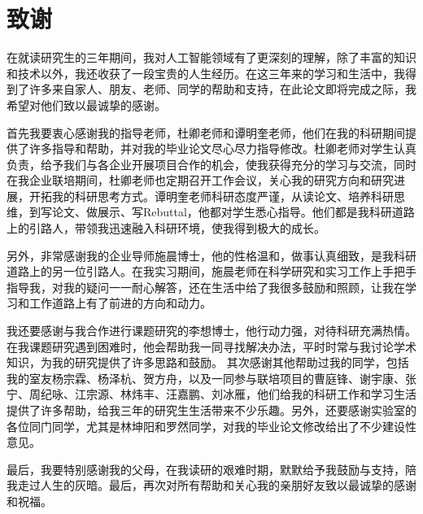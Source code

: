 \chapter{致\texorpdfstring{\quad}{}谢}

在就读研究生的三年期间，我对人工智能领域有了更深刻的理解，除了丰富的知识和技术以外，我还收获了一段宝贵的人生经历。在这三年来的学习和生活中，我得到了许多来自家人、朋友、老师、同学的帮助和支持，在此论文即将完成之际，我希望对他们致以最诚挚的感谢。

首先我要衷心感谢我的指导老师，杜卿老师和谭明奎老师，他们在我的科研期间提供了许多指导和帮助，并对我的毕业论文尽心尽力指导修改。杜卿老师对学生认真负责，给予我们与各企业开展项目合作的机会，使我获得充分的学习与交流，同时在我企业联培期间，杜卿老师也定期召开工作会议，关心我的研究方向和研究进展，开拓我的科研思考方式。谭明奎老师科研态度严谨，从读论文、培养科研思维，到写论文、做展示、写Rebuttal，他都对学生悉心指导。他们都是我科研道路上的引路人，带领我迅速融入科研环境，使我得到极大的成长。

另外，非常感谢我的企业导师施晨博士，他的性格温和，做事认真细致，是我科研道路上的另一位引路人。在我实习期间，施晨老师在科学研究和实习工作上手把手指导我，对我的疑问一一耐心解答，还在生活中给了我很多鼓励和照顾，让我在学习和工作道路上有了前进的方向和动力。

我还要感谢与我合作进行课题研究的李想博士，他行动力强，对待科研充满热情。在我课题研究遇到困难时，他会帮助我一同寻找解决办法，平时时常与我讨论学术知识，为我的研究提供了许多思路和鼓励。
其次感谢其他帮助过我的同学，包括我的室友杨宗霖、杨泽杭、贺方舟，以及一同参与联培项目的曹庭锋、谢宇康、张宁、周纪咏、江宗源、林炜丰、汪嘉鹏、刘冰雁，他们给我的科研工作和学习生活提供了许多帮助，给我三年的研究生生活带来不少乐趣。另外，还要感谢实验室的各位同门同学，尤其是林坤阳和罗然同学，对我的毕业论文修改给出了不少建设性意见。

最后，我要特别感谢我的父母，在我读研的艰难时期，默默给予我鼓励与支持，陪我走过人生的灰暗。最后，再次对所有帮助和关心我的亲朋好友致以最诚挚的感谢和祝福。


